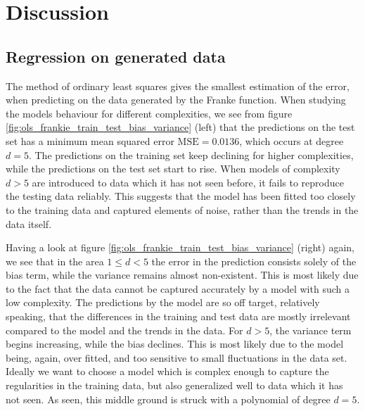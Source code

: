 \section{Discussion}\label{sec:Discussion}


\subsection{Regression on generated data}
The method of ordinary least squares gives the smallest estimation of the error, when predicting on the data generated by the Franke function. When studying the models behaviour for different complexities, we see from figure \ref{fig:ols_frankie_train_test_bias_variance} (left) that the predictions on the test set has a minimum mean squared error $\text{MSE} = 0.0136$, which occurs at degree $d = 5$. The predictions on the training set keep declining for higher complexities, while the predictions on the test set start to rise. When models of complexity $d > 5$ are introduced to data which it has not seen before, it fails to reproduce the testing data reliably. This suggests that the model has been fitted too closely to the training data and captured elements of noise, rather than the trends in the data itself.

Having a look at figure \ref{fig:ols_frankie_train_test_bias_variance} (right) again, we see that in the area $1 \leq d < 5$ the error in the prediction consists solely of the bias term, while the variance remains almost non-existent. This is most likely due to the fact that the data cannot be captured accurately by a model with such a low complexity. The predictions by the model are so off target, relatively speaking, that the differences in the training and test data are mostly irrelevant compared to the model and the trends in the data. For $d > 5$, the variance term begins increasing, while the bias declines. This is most likely due to the model being, again, over fitted, and too sensitive to small fluctuations in the data set. Ideally we want to choose a model which is complex enough to capture the regularities in the training data, but also generalized well to data which it has not seen. As seen, this middle ground is struck with a polynomial of degree $d=5$.

